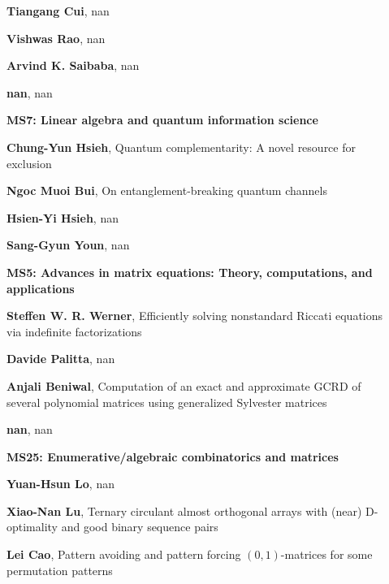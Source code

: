 \documentclass[ILAS2025-program.tex]{subfiles}
\begin{document}
\begin{description}
\begin{description}
    \item[] \textbf{Tiangang Cui}, nan
        \item[] \textbf{Vishwas Rao}, nan
        \item[] \textbf{Arvind K. Saibaba}, nan
        \item[] \textbf{nan}, nan
        \end{description}
    \begin{description}
    \item[] {\color{mstitle}\textbf{MS7: Linear algebra and quantum information science}} 
    \item[] \textbf{Chung-Yun Hsieh}, Quantum complementarity: A novel resource for exclusion
        \item[] \textbf{Ngoc Muoi Bui}, On entanglement-breaking quantum channels
        \item[] \textbf{Hsien-Yi Hsieh}, nan
        \item[] \textbf{Sang-Gyun Youn}, nan
        \end{description}
    \begin{description}
    \item[] {\color{mstitle}\textbf{MS5: Advances in matrix equations: Theory, computations, and applications}} 
    \item[] \textbf{Steffen W. R. Werner}, Efficiently solving nonstandard Riccati equations via indefinite factorizations
        \item[] \textbf{Davide Palitta}, nan
        \item[] \textbf{Anjali Beniwal}, Computation of an exact and approximate GCRD of several polynomial matrices using generalized Sylvester matrices
        \item[] \textbf{nan}, nan
        \end{description}
    \begin{description}
    \item[] {\color{mstitle}\textbf{MS25: Enumerative/algebraic combinatorics and matrices}} 
    \item[] \textbf{Yuan-Hsun Lo}, nan
        \item[] \textbf{Xiao-Nan Lu}, Ternary circulant almost orthogonal arrays with (near) D-optimality and good binary sequence pairs
        \item[] \textbf{Lei Cao}, Pattern avoiding and pattern forcing $(0,1)$-matrices for some permutation patterns


\end{description}
\end{description}
\end{document}
